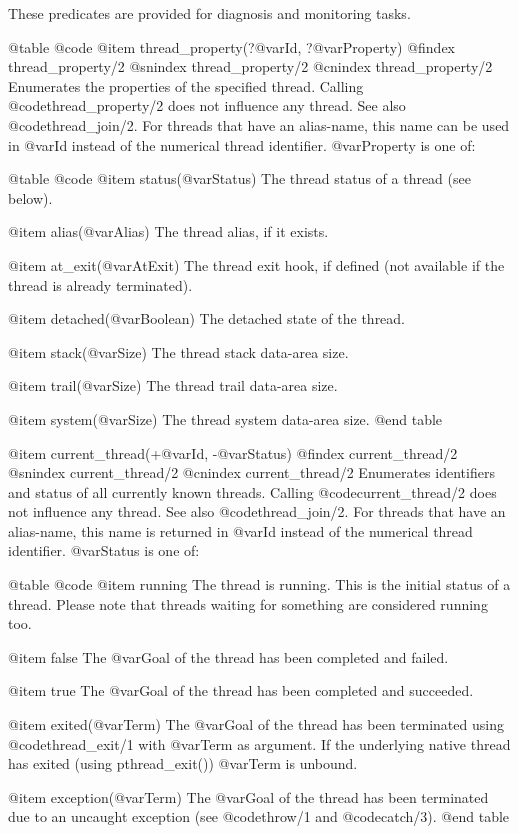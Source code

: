 {{{{{{{{These predicates are provided for diagnosis and monitoring tasks.


@table @code
@item thread_property(?@var{Id}, ?@var{Property})
@findex thread_property/2
@snindex thread_property/2
@cnindex thread_property/2
Enumerates the properties of the specified thread.
Calling @code{thread_property/2} does not influence any thread.  See also
@code{thread_join/2}.  For threads that have an alias-name, this name can
be used in @var{Id} instead of the numerical thread identifier.
@var{Property} is one of:

@table @code
    @item status(@var{Status})
The thread status of a thread (see below).

    @item alias(@var{Alias})
The thread alias, if it exists.

    @item at_exit(@var{AtExit})
The thread exit hook, if defined (not available if the thread is already terminated).

    @item detached(@var{Boolean})
The detached state of the thread.

    @item stack(@var{Size})
The thread stack data-area size.

    @item trail(@var{Size})
The thread trail data-area size.

    @item system(@var{Size})
The thread system data-area size.
@end table

@item current_thread(+@var{Id}, -@var{Status})
@findex current_thread/2
@snindex current_thread/2
@cnindex current_thread/2
Enumerates identifiers and status of all currently known threads.
Calling @code{current_thread/2} does not influence any thread.  See also
@code{thread_join/2}.  For threads that have an alias-name, this name is
returned in @var{Id} instead of the numerical thread identifier.
@var{Status} is one of:

@table @code
    @item running
The thread is running.  This is the initial status of a thread.  Please
note that threads waiting for something are considered running too.

    @item false
The @var{Goal} of the thread has been completed and failed.

    @item true
The @var{Goal} of the thread has been completed and succeeded.

    @item exited(@var{Term})
The @var{Goal} of the thread has been terminated using @code{thread_exit/1}
with @var{Term} as argument.  If the underlying native thread has
exited (using pthread_exit()) @var{Term} is unbound.

    @item exception(@var{Term})
The @var{Goal} of the thread has been terminated due to an uncaught
exception (see @code{throw/1} and @code{catch/3}).
@end table

}}}}}}}}
